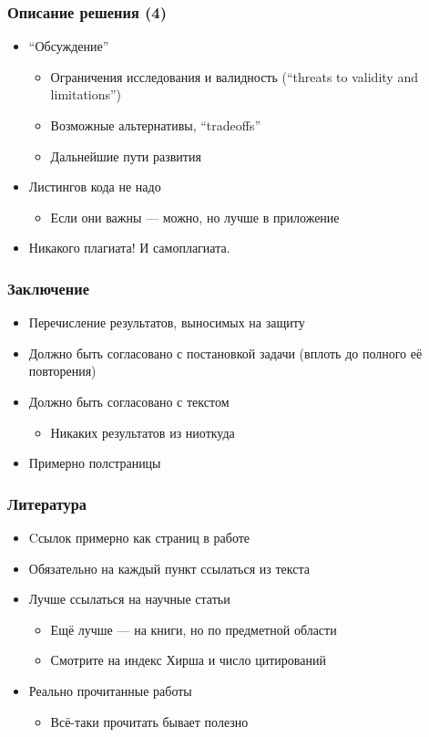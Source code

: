 \documentclass[xetex,mathserif,serif]{beamer}
\begin{document}
	\begin{frame}
		\frametitle{Описание решения (4)}
		\begin{itemize}
			\item ``Обсуждение''
			\begin{itemize}
				\item Ограничения исследования и валидность (``threats to validity and limitations'')
				\item Возможные альтернативы, ``tradeoffs''
				\item Дальнейшие пути развития
			\end{itemize}
			\item Листингов кода не надо
			\begin{itemize}
				\item Если они важны --- можно, но лучше в приложение
			\end{itemize}
			\item Никакого плагиата! И самоплагиата.
		\end{itemize}
	\end{frame}

	\begin{frame}
		\frametitle{Заключение}
		\begin{itemize}
			\item Перечисление результатов, выносимых на защиту
			\item Должно быть согласовано с постановкой задачи (вплоть до полного её повторения)
			\item Должно быть согласовано с текстом
			\begin{itemize}
				\item Никаких результатов из ниоткуда
			\end{itemize}
			\item Примерно полстраницы
		\end{itemize}
	\end{frame}

	\begin{frame}
		\frametitle{Литература}
		\begin{itemize}
			\item Cсылок примерно как страниц в работе
			\item Обязательно на каждый пункт ссылаться из текста
			\item Лучше ссылаться на научные статьи
			\begin{itemize}
				\item Ещё лучше --- на книги, но по предметной области
				\item Смотрите на индекс Хирша и число цитирований
			\end{itemize}
			\item Реально прочитанные работы
			\begin{itemize}
				\item Всё-таки прочитать бывает полезно
			\end{itemize}
		\end{itemize}
	\end{frame}
\end{document}
